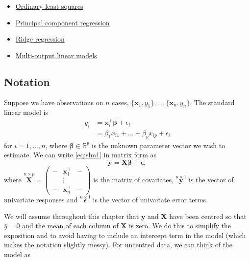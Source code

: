 \documentclass[
]{book}
\providecommand{\tightlist}{%
  \setlength{\itemsep}{0pt}\setlength{\parskip}{0pt}}
\theoremstyle{definition}
\theoremstyle{definition}
\theoremstyle{definition}
\theoremstyle{definition}
\theoremstyle{remark}
\begin{document}
\begin{itemize}
\tightlist
\item
  \href{https://mediaspace.nottingham.ac.uk/media/Linear+ModelsA+Ordinary+Least+Squares/1_ytvk0uc6}{Ordinary least squares}
\item
  \href{https://mediaspace.nottingham.ac.uk/media/Linear+ModelsA+Principal+Component+Regression/1_h0l11uvw}{Principal component regression}
\item
  \href{https://mediaspace.nottingham.ac.uk/media/Linear+ModelsA+Ridge+Regression/1_rjnxkukd}{Ridge regression}
\item
  \href{https://mediaspace.nottingham.ac.uk/media/Linear+modelsA+multi-output+models/1_f61kjm7u}{Multi-output linear models}
\end{itemize}

\hypertarget{notation-3}{%
\subsection*{Notation}\label{notation-3}}

Suppose we have observations on \(n\) cases, \(\{\mathbf x_1, y_1\}, \ldots, \{\mathbf x_n, y_n\}\). The standard linear model is
\begin{align}
y_i &= \mathbf x_i^\top \boldsymbol \beta+\epsilon_i
\label{eq:slm1}\\
&=\beta_1 x_{i1}+\ldots+\beta_p x_{ip}+\epsilon_i
\end{align}
for \(i=1, \ldots , n\),
where \(\boldsymbol \beta\in \mathbb{R}^p\) is the unknown parameter vector we wish to estimate. We can write \eqref{eq:slm1} in matrix form as
\begin{equation}
\mathbf y=\mathbf X\boldsymbol \beta+{\pmb \epsilon},
\label{eq:slm2}
\end{equation}
where \(\stackrel{n \times p}{\mathbf X}= \begin{pmatrix} - & \mathbf x_1^\top &-\\ &\vdots&\\ -&\mathbf x_n^\top&-\end{pmatrix}\) is the matrix of covariates,
\(\stackrel{n \times 1}{\mathbf y}\) is the vector of univariate responses and \(\stackrel{n \times 1}{\pmb \epsilon}\) is the vector of univariate error terms.

We will assume throughout this chapter that \(\mathbf y\) and \(\mathbf X\) have been centred so that \(\bar{y}=0\) and the mean of each column of \(\mathbf X\) is zero. We do this to simplify the exposition and to avoid having to include an intercept term in the model (which makes the notation slightly messy). For uncentred data, we can think of the model as
\end{document}
